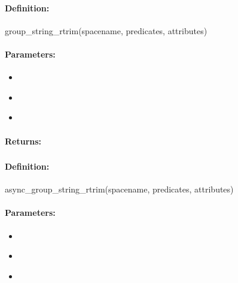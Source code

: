 \paragraph{Definition:}
\begin{rubycode}
group_string_rtrim(spacename, predicates, attributes)
\end{rubycode}

\paragraph{Parameters:}
\begin{itemize}[noitemsep]
\item {}\\

\item {}\\

\item {}\\

\end{itemize}

\paragraph{Returns:}


\pagebreak
\subsubsection{}
\label{api:ruby:async_group_string_rtrim}


\paragraph{Definition:}
\begin{rubycode}
async_group_string_rtrim(spacename, predicates, attributes)
\end{rubycode}

\paragraph{Parameters:}
\begin{itemize}[noitemsep]
\item {}\\

\item {}\\

\item {}\\

\end{itemize}

